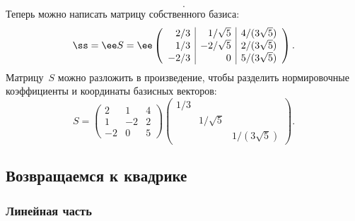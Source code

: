 \begin{solution}
\[		.
	\]
	Теперь можно написать матрицу собственного базиса:
	\[
		\ss = \ee S =
		\ee
		\left( 
			\begin{array}{r|r|r}
				 2/3 &  1/\sqrt{5} & 4/(3\sqrt{5}) \\
				 1/3 & -2/\sqrt{5} & 2/(3\sqrt{5}) \\
				-2/3 &  0          & 5/(3\sqrt{5})
			\end{array}
		\right)
		.
	\]
	Матрицу~$S$ можно разложить в произведение, чтобы разделить нормировочные коэффициенты и координаты базисных векторов:
	\[
		S =
		\left( 
			\begin{array}{rrr}
				 2 &  1 & 4 \\
				 1 & -2 & 2 \\
				-2 &  0 & 5
			\end{array}
		\right)
		\begin{pmatrix}
			1/3 \\
			& 1/\sqrt{5} \\
			&& 1/(3\sqrt{5})
		\end{pmatrix}
		.
	\]

	\subsection{Возвращаемся к квадрике}

	\subsubsection{Линейная часть}


\end{solution}
